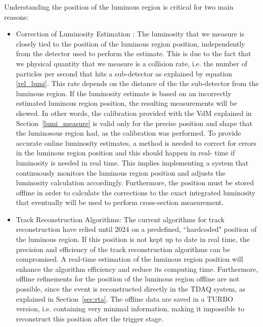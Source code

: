 Understanding the position of the luminous region is critical for two main reasons:
\begin{itemize}
\item Correction of Luminosity Estimation : The luminosity that we measure is closely tied to the position of the luminous region position, independently from the detector used to perform the estimate. This is due to the fact that we physical quantity that we measure is a collision rate, i.e. the number of particles per second that hits a sub-detector as explained by equation \eqref{rel_lumi}. This rate depends on the distance of the the sub-detector from the luminous region. If the luminosity estimate is based on an incorrectly estimated luminous region position, the resulting measurements will be skewed. In other words, the calibration provided with the VdM explained in Section~\ref{lumi_measure} is valid only for the precise position and shape that the luminosous region had, as the calibration was performed. To provide accurate online luminosity estimates, a method is needed to correct for errors in the luminous region position and this should happen in real- time if luminosity is needed in real time. This implies implementing a system that continuously monitors the luminous region position and adjusts the luminosity calculation accordingly. Furthermore, the position must be stored offline in order to calculate the corrections to the exact integrated luminosity that eventually will be used to perform cross-section measurement.
\item Track Reconstruction Algorithms: The current algorithms for track reconstruction have relied until 2024 on a predefined, ``hardcoded" position of the luminous region. If this position is not kept up to date in real time, the precision and efficiency of the track reconstruction algorithms can be compromised. A real-time estimation of the luminous region position will enhance the algorithm efficiency and reduce its computing time. Furthermore, offline refinements for the position of the luminous region offline are not possible, since the event is reconstructed directly in the TDAQ system, as explained in Section~\ref{sec:rta}. The offline data are saved in a TURBO version, i.e. containing very minimal information, making it impossible to reconstruct this position after the trigger stage.
\end{itemize}


